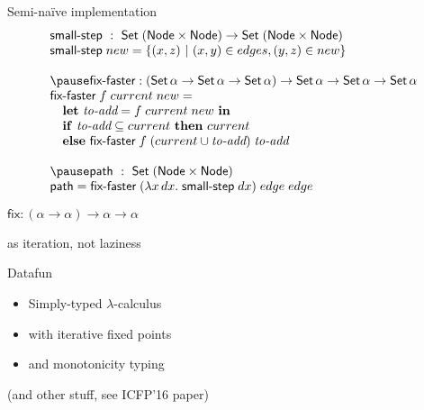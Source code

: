 \documentclass{beamer}
\newcommand{\ms}{\mathsf}
\newcommand{\x}{\times}
\newcommand{\setfor}[2]{\{#1 ~|~ #2\}}
\begin{document}

\begin{frame}{\Large Semi-na\"ive implementation}\large
  \[
  \begin{array}{l}
    \textsf{small-step} ~:~ \ms{Set}\;(\ms{Node} \x \ms{Node})
    \to \ms{Set}\;(\ms{Node} \x \ms{Node})\\
    \textsf{small-step} \; new =
    \setfor{(x,z)}{(x,y) \in edges, (y,z) \in new}\\
    \\
    \pause
    \textsf{fix-faster} : (\ms{Set}\,\alpha \to \ms{Set}\,\alpha \to \ms{Set} \,\alpha)
    \to \ms{Set}\,\alpha \to \ms{Set}\,\alpha \to \ms{Set}\,\alpha\\
    \textsf{fix-faster} \; f \; current \; new =\\
    \quad \mathbf{let}~\textit{to-add} = f \; current \; new ~\mathbf{in}\\
    \quad \mathbf{if}~ \textit{to-add} \subseteq current ~\mathbf{then}~ current\\
    \quad \mathbf{else}~ \textsf{fix-faster}\; f \; (current \cup \textit{to-add}) \; \textit{to-add}\\
    \\
    \pause
    \textsf{path} ~:~ \ms{Set}\; (\ms{Node} \x \ms{Node})\\
    \textsf{path} = \textsf{fix-faster}\; (\lambda x\, dx.\; \textsf{small-step}\; dx)
    \; edge \; edge
  \end{array}
  \]
\end{frame}


\begin{frame}
  \Huge\centering
  $\ms{fix} : (\alpha \to \alpha) \to \alpha \to \alpha$

  \vspace{0.66em}
  \huge
  as iteration, not laziness
\end{frame}

\begin{frame}
  \Huge 
  \begin{center} Datafun \end{center}

  \huge
  \begin{itemize}
  \item Simply-typed $\lambda$-calculus
  \item with iterative fixed points
  \item and monotonicity typing
  \end{itemize}
  \vspace{0.5cm}

  \large (and other stuff, see ICFP'16 paper)
\end{frame}
\end{document}
